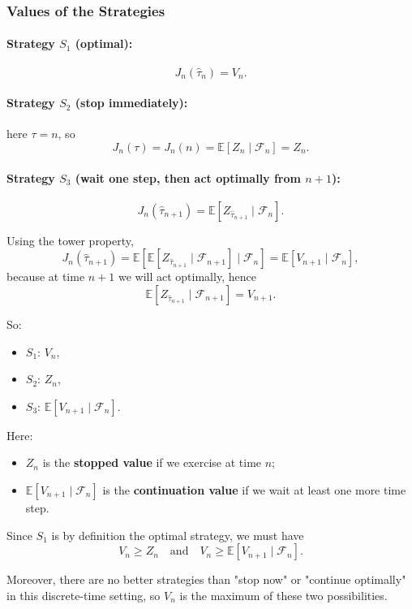 \documentclass[12pt,a4paper]{article}
\theoremstyle{definition}
\begin{document}
\subsubsection{Values of the Strategies}

\paragraph{Strategy $S_1$ (optimal):}
\[
J_n(\widehat{\tau}_n) = V_n.
\]

\paragraph{Strategy $S_2$ (stop immediately):}
here $\tau = n$, so
\[
J_n(\tau) = J_n(n) = \mathbb{E}[Z_n \mid \mathcal{F}_n] = Z_n.
\]

\paragraph{Strategy $S_3$ (wait one step, then act optimally from $n+1$):}
\[
J_n(\widehat{\tau}_{n+1}) = \mathbb{E}\left[Z_{\widehat{\tau}_{n+1}} \mid \mathcal{F}_n\right].
\]

Using the tower property,
\[
J_n(\widehat{\tau}_{n+1}) = \mathbb{E}\left[\mathbb{E}[Z_{\widehat{\tau}_{n+1}} \mid \mathcal{F}_{n+1}] \mid \mathcal{F}_n\right] = \mathbb{E}[V_{n+1} \mid \mathcal{F}_n],
\]
because at time $n+1$ we will act optimally, hence
\[
\mathbb{E}[Z_{\widehat{\tau}_{n+1}} \mid \mathcal{F}_{n+1}] = V_{n+1}.
\]

So:
\begin{itemize}
\item $S_1$: $V_n$,
\item $S_2$: $Z_n$,
\item $S_3$: $\mathbb{E}[V_{n+1} \mid \mathcal{F}_n]$.
\end{itemize}

Here:
\begin{itemize}
\item $Z_n$ is the \textbf{stopped value} if we exercise at time $n$;
\item $\mathbb{E}[V_{n+1} \mid \mathcal{F}_n]$ is the \textbf{continuation value} if we wait at least one more time step.
\end{itemize}

Since $S_1$ is by definition the optimal strategy, we must have
\[
V_n \geq Z_n \quad \text{and} \quad V_n \geq \mathbb{E}[V_{n+1} \mid \mathcal{F}_n].
\]

Moreover, there are no better strategies than "stop now" or "continue optimally" in this discrete-time setting, so $V_n$ is the maximum of these two possibilities.
\end{document}
